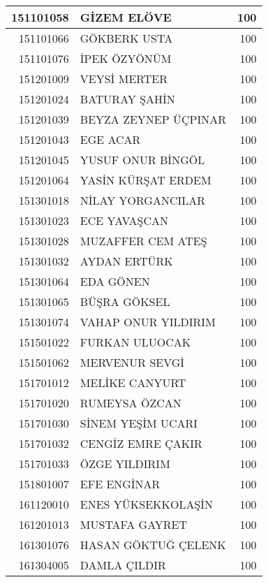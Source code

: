 \documentclass[12pt]{article}
\begin{document}
\begin{longtable}{||r||l||r||}
    \midrule
    151101058 & GİZEM ELÖVE & 100 \\
    \midrule
    151101066 & GÖKBERK USTA & 100 \\
    \midrule
    151101076 & İPEK ÖZYÖNÜM & 100 \\
    \midrule
    151201009 & VEYSİ MERTER & 100 \\
    \midrule
    151201024 & BATURAY ŞAHİN & 100 \\
    \midrule
    151201039 & BEYZA ZEYNEP ÜÇPINAR & 100 \\
    \midrule
    151201043 & EGE ACAR & 100 \\
    \midrule
    151201045 & YUSUF ONUR BİNGÖL & 100 \\
    \midrule
    151201064 & YASİN KÜRŞAT ERDEM & 100 \\
    \midrule
    151301018 & NİLAY YORGANCILAR & 100 \\
    \midrule
    151301023 & ECE YAVAŞCAN & 100 \\
    \midrule
    151301028 & MUZAFFER CEM ATEŞ & 100 \\
    \midrule
    151301032 & AYDAN ERTÜRK & 100 \\
    \midrule
    151301064 & EDA GÖNEN & 100 \\
    \midrule
    151301065 & BÜŞRA GÖKSEL & 100 \\
    \midrule
    151301074 & VAHAP ONUR YILDIRIM & 100 \\
    \midrule
    151501022 & FURKAN ULUOCAK & 100 \\
    \midrule
    151501062 & MERVENUR SEVGİ & 100 \\
    \midrule
    151701012 & MELİKE CANYURT & 100 \\
    \midrule
    151701020 & RUMEYSA ÖZCAN & 100 \\
    \midrule
    151701030 & SİNEM YEŞİM UCARI & 100 \\
    \midrule
    151701032 & CENGİZ EMRE ÇAKIR & 100 \\
    \midrule
    151701033 & ÖZGE YILDIRIM & 100 \\
    \midrule
    151801007 & EFE ENGİNAR & 100 \\
    \midrule
    161120010 & ENES YÜKSEKKOLAŞİN & 100 \\
    \midrule
    161201013 & MUSTAFA GAYRET & 100 \\
    \midrule
    161301076 & HASAN GÖKTUĞ ÇELENK & 100 \\
    \midrule
    161304005 & DAMLA ÇILDIR & 100 \\

\end{longtable}
\end{document}
